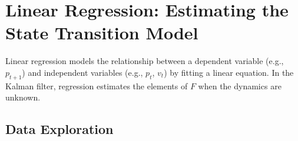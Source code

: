 \documentclass[12pt]{article}
\begin{document}
\section{Linear Regression: Estimating the State Transition Model}
\label{sec:regression}

Linear regression models the relationship between a dependent variable (e.g., \( p_{t+1} \)) and independent variables (e.g., \( p_t \), \( v_t \)) by fitting a linear equation. In the Kalman filter, regression estimates the elements of \( F \) when the dynamics are unknown.



\subsection{Data Exploration}
\label{subsec:data_exploration}
\end{document}
